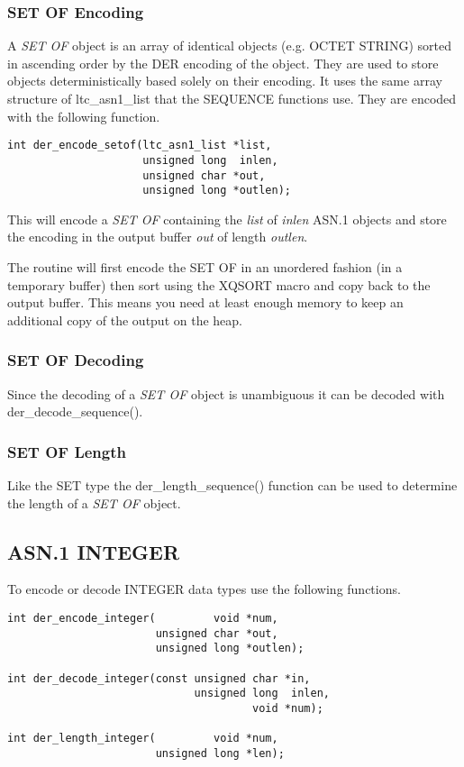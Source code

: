 \documentclass[synpaper]{book}
\begin{document}
\subsubsection{SET OF Encoding}
A \textit{SET OF} object is an array of identical objects (e.g. OCTET STRING) sorted in ascending order by the DER encoding of the object.  They are
used to store objects deterministically based solely on their encoding.  It uses the same array structure of ltc\_asn1\_list that the SEQUENCE functions
use.  They are encoded with the following function.

\begin{verbatim}
int der_encode_setof(ltc_asn1_list *list,
                     unsigned long  inlen,
                     unsigned char *out,
                     unsigned long *outlen);
\end{verbatim}

This will encode a \textit{SET OF} containing the \textit{list} of \textit{inlen} ASN.1 objects and store the encoding in the output buffer \textit{out} of length \textit{outlen}.

The routine will first encode the SET OF in an unordered fashion (in a temporary buffer) then sort using the XQSORT macro and copy back to the output buffer.  This
means you need at least enough memory to keep an additional copy of the output on the heap.

\subsubsection{SET OF Decoding}
Since the decoding of a \textit{SET OF} object is unambiguous it can be decoded with der\_decode\_sequence().

\subsubsection{SET OF Length}
Like the SET type the der\_length\_sequence() function can be used to determine the length of a \textit{SET OF} object.

\subsection{ASN.1 INTEGER}

To encode or decode INTEGER data types use the following functions.

\begin{verbatim}
int der_encode_integer(         void *num,
                       unsigned char *out,
                       unsigned long *outlen);

int der_decode_integer(const unsigned char *in,
                             unsigned long  inlen,
                                      void *num);

int der_length_integer(         void *num,
                       unsigned long *len);
\end{verbatim}
\end{document}
